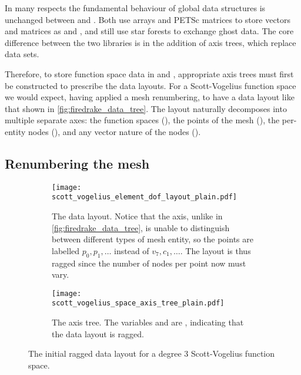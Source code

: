 \documentclass[thesis]{subfiles}
\begin{document}
In many respects the fundamental behaviour of global data structures is unchanged between  and .
Both use \numpy{} arrays and PETSc matrices to store vectors and matrices as  and , and  still use star forests to exchange ghost data.
The core difference between the two libraries is in the addition of axis trees, which replace  data sets.

Therefore, to store function space data in   and , appropriate axis trees must first be constructed to prescribe the data layouts.
For a Scott-Vogelius function space we would expect, having applied a mesh renumbering, to have a data layout like that shown in \cref{fig:firedrake_data_tree}.
The layout naturally decomposes into multiple separate axes: the function spaces (), the points of the mesh (), the per-entity nodes (), and any vector nature of the nodes ().

\subsection{Renumbering the mesh}
\label{sec:firedrake_renumbering_mesh}

\begin{figure}
  \centering
  \begin{subfigure}{\textwidth}
    \centering
    \texttt{[image: scott\_vogelius\_element\_dof\_layout\_plain.pdf]}
    \caption{
      The data layout.
      Notice that the  axis, unlike in \cref{fig:firedrake_data_tree}, is unable to distinguish between different types of mesh entity, so the points are labelled $p_0, p_1, \dots$ instead of $v_7, c_1, \dots$.
      The layout is thus ragged since the number of nodes per point now must vary.
    }
    \label{fig:firedrake_data_tree_plain}
  \end{subfigure}

  \vspace{1em}

  \begin{subfigure}{\textwidth}
    \centering
    \texttt{[image: scott\_vogelius\_space\_axis\_tree\_plain.pdf]}
    \caption{
      The axis tree.
      The variables  and  are , indicating that the data layout is ragged.
    }
    \label{fig:firedrake_axis_tree_plain}
  \end{subfigure}
  \caption{
    The initial ragged data layout for a degree 3 Scott-Vogelius function space.
  }
  \label{fig:firedrake_plain}
\end{figure}
\end{document}
